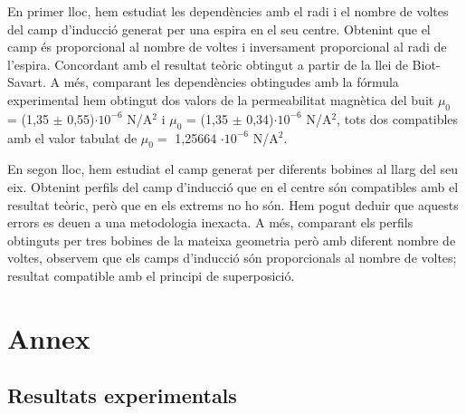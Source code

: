 \documentclass[11pt]{article}
\numberwithin{equation}{section}
\numberwithin{figure}{section}
\numberwithin{table}{section}
\begin{document}
En primer lloc, hem estudiat les dependències amb el radi i el nombre de voltes del camp d'inducció generat per una espira en el seu centre. Obtenint que el camp és proporcional al nombre de voltes i inversament proporcional al radi de l'espira. Concordant amb el resultat teòric obtingut a partir de la llei de Biot-Savart. A més, comparant les dependències obtingudes amb la fórmula experimental hem obtingut dos valors de la permeabilitat magnètica del buit $\mu_0$ = (1,35 $\pm$ 0,55)$\cdot10^{-6}$ N/A$^2$ i $\mu_0$ = (1,35 $\pm$ 0,34)$\cdot10^{-6}$ N/A$^2$, tots dos compatibles amb el valor tabulat de $\mu_0 =$  1,25664 $\cdot 10^{-6}$ N/A$^2$.

En segon lloc, hem estudiat el camp generat per diferents bobines al llarg del seu eix. Obtenint perfils del camp d'inducció que en el centre són compatibles amb el resultat teòric, però que en els extrems no ho són. Hem pogut deduir que aquests errors es deuen a una metodologia inexacta. A més, comparant els perfils obtinguts per tres bobines de la mateixa geometria però amb diferent nombre de voltes, observem que els camps d'inducció són proporcionals al nombre de voltes; resultat compatible amb el principi de superposició.



\newpage

\appendix
\section{Annex}


\subsection{Resultats experimentals}\label{taules_dades_exp}
\end{document}
